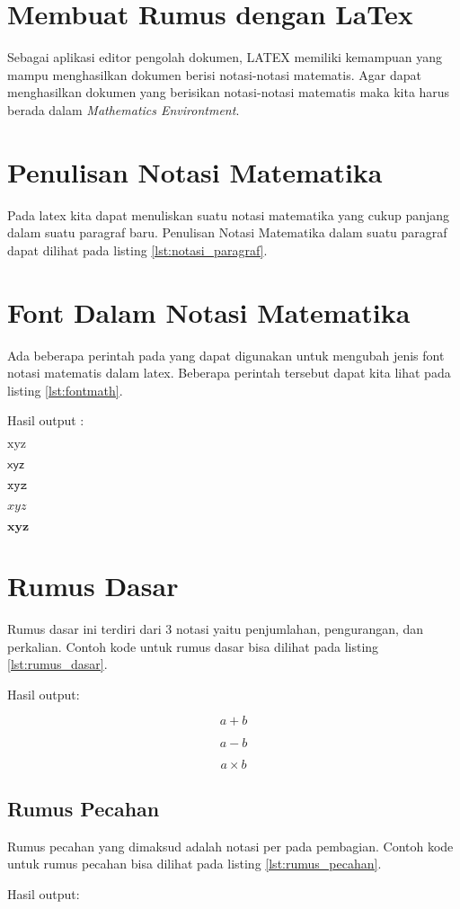 \section{Membuat Rumus dengan LaTex}
Sebagai aplikasi editor pengolah dokumen, LATEX memiliki kemampuan yang mampu menghasilkan dokumen berisi notasi-notasi matematis. Agar dapat menghasilkan dokumen yang berisikan notasi-notasi matematis maka kita harus berada dalam \textit{Mathematics Environtment}.

\section{Penulisan Notasi Matematika}
Pada latex kita dapat menuliskan suatu notasi matematika yang cukup panjang dalam suatu paragraf baru. Penulisan Notasi Matematika dalam suatu paragraf dapat dilihat pada listing \ref{lst:notasi_paragraf}.


\section{Font Dalam Notasi Matematika}
Ada beberapa perintah pada yang dapat digunakan untuk mengubah jenis font notasi matematis dalam latex. Beberapa perintah tersebut dapat kita lihat pada listing \ref{lst:fontmath}.


Hasil output : 

$\mathrm{x y z}$

$\mathsf{x y z}$

$\mathtt{x y z}$

$\mathit{x y z}$

$\mathbf{x y z}$

\section{Rumus Dasar}
Rumus dasar ini terdiri dari 3 notasi yaitu penjumlahan, pengurangan, dan perkalian. Contoh kode untuk rumus dasar bisa dilihat pada listing \ref{lst:rumus_dasar}.

Hasil output:

$$ a+b$$

$$ a-b$$

$$ a \times b$$

\subsection{Rumus Pecahan}
Rumus pecahan yang dimaksud adalah notasi per pada pembagian. Contoh kode untuk rumus pecahan bisa dilihat pada listing \ref{lst:rumus_pecahan}.

Hasil output:

